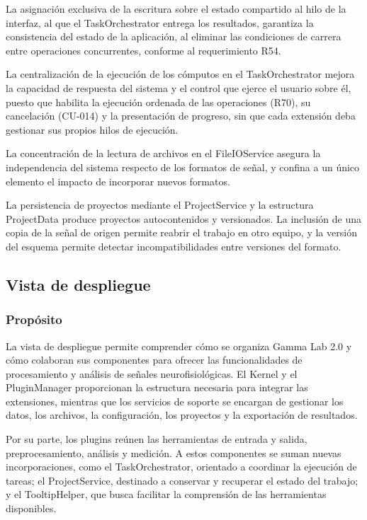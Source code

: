 \documentclass[11pt,a4paper]{article}
\DeclareRobustCommand{\_}{\textunderscore\allowbreak}
\begin{document}
La asignación exclusiva de la escritura sobre el estado compartido al hilo de la interfaz, al que el TaskOrchestrator entrega los resultados, garantiza la consistencia del estado de la aplicación, al eliminar las condiciones de carrera entre operaciones concurrentes, conforme al requerimiento R54.

La centralización de la ejecución de los cómputos en el TaskOrchestrator mejora la capacidad de respuesta del sistema y el control que ejerce el usuario sobre él, puesto que habilita la ejecución ordenada de las operaciones (R70), su cancelación (CU-014) y la presentación de progreso, sin que cada extensión deba gestionar sus propios hilos de ejecución.

La concentración de la lectura de archivos en el FileIOService asegura la independencia del sistema respecto de los formatos de señal, y confina a un único elemento el impacto de incorporar nuevos formatos.

La persistencia de proyectos mediante el ProjectService y la estructura ProjectData produce proyectos autocontenidos y versionados. La inclusión de una copia de la señal de origen permite reabrir el trabajo en otro equipo, y la versión del esquema permite detectar incompatibilidades entre versiones del formato.

\subsection{Vista de despliegue}
\subsubsection{Propósito}
La vista de despliegue permite comprender cómo se organiza Gamma Lab 2.0 y cómo colaboran sus componentes para ofrecer las funcionalidades de procesamiento y análisis de señales neurofisiológicas. El Kernel y el PluginManager proporcionan la estructura necesaria para integrar las extensiones, mientras que los servicios de soporte se encargan de gestionar los datos, los archivos, la configuración, los proyectos y la exportación de resultados.

Por su parte, los plugins reúnen las herramientas de entrada y salida, preprocesamiento, análisis y medición. A estos componentes se suman nuevas incorporaciones, como el TaskOrchestrator, orientado a coordinar la ejecución de tareas; el ProjectService, destinado a conservar y recuperar el estado del trabajo; y el TooltipHelper, que busca facilitar la comprensión de las herramientas disponibles.
\end{document}
